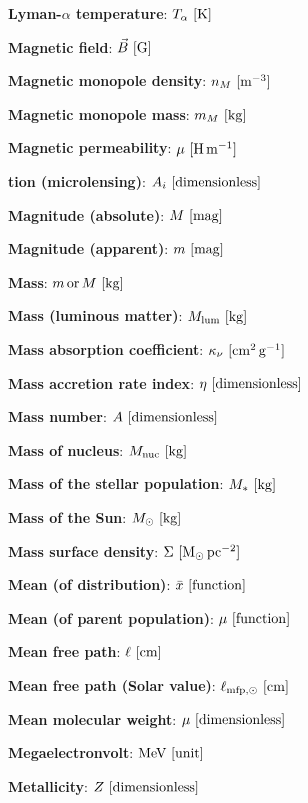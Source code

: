 \documentclass[a4paper,10pt]{article}
\begin{document}
{\noindent}\textbf{Lyman-$\alpha$ temperature}: $T_\alpha ~ [{\rm K}]$

{\noindent}\textbf{Magnetic field}: $\vec{B} ~ [{\rm G}]$

{\noindent}\textbf{Magnetic monopole density}: $n_M ~ [{\rm m^{-3}}]$

{\noindent}\textbf{Magnetic monopole mass}: $m_M ~ [{\rm kg}]$

{\noindent}\textbf{Magnetic permeability}: $\mu ~ [{\rm H\,m^{-1}}]$

{\noindent}\textbf{tion (microlensing)}: $A_i ~ [{\rm dimensionless}]$

{\noindent}\textbf{Magnitude (absolute)}: $M ~ [{\rm mag}]$

{\noindent}\textbf{Magnitude (apparent)}: $m ~ [{\rm mag}]$

{\noindent}\textbf{Mass}: $m\,{\rm or}\,M ~ [{\rm kg}]$

{\noindent}\textbf{Mass (luminous matter)}: $M_{\rm lum} ~ [{\rm kg}]$

{\noindent}\textbf{Mass absorption coefficient}: $\kappa_\nu ~ [{\rm cm^2\,g^{-1}}]$

{\noindent}\textbf{Mass accretion rate index}: $\eta ~ [{\rm dimensionless}]$

{\noindent}\textbf{Mass number}: $A ~ [{\rm dimensionless}]$

{\noindent}\textbf{Mass of nucleus}: $M_{\rm nuc} ~ [{\rm kg}]$

{\noindent}\textbf{Mass of the stellar population}: $M_* ~ [{\rm kg}]$

{\noindent}\textbf{Mass of the Sun}: $M_\odot ~ [{\rm kg}]$

{\noindent}\textbf{Mass surface density}: $\Sigma ~ [{\rm M_\odot\,pc^{-2}}]$

{\noindent}\textbf{Mean (of distribution)}: $\bar{x} ~ [{\rm function}]$

{\noindent}\textbf{Mean (of parent population)}: $\mu ~ [{\rm function}]$

{\noindent}\textbf{Mean free path}: $\ell ~ [{\rm cm}]$

{\noindent}\textbf{Mean free path (Solar value)}: $\ell_{{\rm mfp},\odot} ~ [{\rm cm}]$

{\noindent}\textbf{Mean molecular weight}: $\mu ~ [{\rm dimensionless}]$

{\noindent}\textbf{Megaelectronvolt}: ${\rm MeV} ~ [{\rm unit}]$

{\noindent}\textbf{Metallicity}: $Z ~ [{\rm dimensionless}]$
\end{document}
